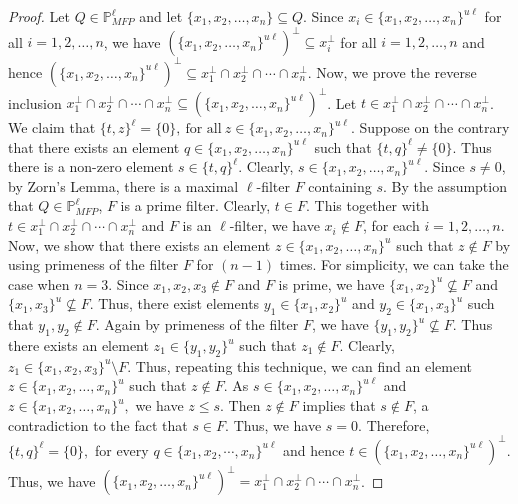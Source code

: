 \documentclass[10pt,one side,emlines]{amsart}
\theoremstyle{definition}
\begin{document}
\begin{proof} Let $Q\in \mathbb{P}^{\ell}_{MFP}$ and let $\{x_1,x_2,\ldots, x_n\} \subseteq Q$. Since $x_i\in \{x_1,x_2,\ldots, x_n\}^{u\ell}$ for all $i=1,2,\ldots, n$, we have $(\{x_1,x_2,\ldots, x_n\}^{u\ell})^{\perp } \subseteq x_i^{\perp }$ for all $i=1,2,\ldots, n$ and hence $(\{x_1,x_2,\ldots, x_n\}^{u\ell})^{\perp } \subseteq x_1^{\perp }\cap x_2^{\perp }\cap \cdots \cap x_n^{\perp }$. Now, we prove the reverse inclusion $ x_1^{\perp }\cap x_2^{\perp }\cap \cdots \cap x_n^{\perp } \subseteq (\{x_1,x_2,\ldots, x_n\}^{u\ell})^{\perp } $. Let $t\in x_1^{\perp }\cap x_2^{\perp }\cap \cdots \cap x_n^{\perp }$. We claim that $\{t,z\}^{\ell}=\{0\},~ \text{for all}~ z\in \{x_1,x_2,\ldots, x_n\}^{u\ell}$. Suppose on the contrary that there exists an element $q\in \{x_1,x_2,\ldots, x_n\}^{u\ell}$ such that $\{t,q\}^{\ell}\neq \{0\}$. Thus there is a non-zero element $s\in \{t,q\}^{\ell}$. Clearly, $s\in \{x_1,x_2,\ldots, x_n\}^{u\ell}$. Since $s\neq 0$, by Zorn’s Lemma, there is a maximal $\ell$-filter $F$ containing $s$. By the assumption that $Q\in \mathbb{P}^{\ell}_{MFP}$, $F$ is a prime filter. Clearly, $t\in F$. This together with $t\in x_1^{\perp }\cap x_2^{\perp }\cap \cdots \cap x_n^{\perp }$ and $F$ is an $\ell$-filter, we have $x_i\not \in F$, for each $i=1,2,\ldots , n$. Now, we show that there exists an element $z\in \{x_1,x_2,\ldots ,x_n\}^{u}$ such that $z\not \in F$ by using primeness of the filter $F$ for $(n-1)$ times. For simplicity, we can take the case when $n=3$. Since $x_1,x_2,x_3 \not \in F$ and $F$ is prime, we have $\{x_1,x_2\}^{u}\not \subseteq F$ and $\{x_1,x_3\}^{u}\not \subseteq F$. Thus, there exist elements $y_1\in \{x_1,x_2\}^{u}$ and $y_2\in \{x_1,x_3\}^{u}$ such that $y_1, y_2 \not \in F$. Again by primeness of the filter $F$, we have $\{y_1,y_2\}^{u}\not \subseteq F$. Thus there exists an element $z_1\in \{y_1,y_2\}^{u}$ such that $z_1\not \in F$. Clearly, $z_1\in \{x_1,x_2,x_3\}^{u} \setminus F $.   Thus, repeating this technique,  we can find an element $z\in \{x_1,x_2,\ldots,x_n\}^{u}$ such that $z\not \in F$.  As  $s\in \{x_1,x_2,\ldots , x_n\}^{u\ell}$ and $z\in \{x_1,x_2,\ldots ,x_n\}^{u},$ we have  $z\leq s.$ Then $z\not \in F$ implies that $s\not \in F$, a contradiction to the fact that $s\in F$. Thus, we have $s=0.$ Therefore, $\{t,q\}^{\ell}=\{0\},$ for every $q\in \{x_1,x_2,\cdots, x_n\}^{u\ell}$ and hence $t\in (\{x_1,x_2,\ldots , x_n\}^{u\ell})^{\perp }$. Thus, we have $(\{x_1,x_2,\ldots , x_n\}^{u\ell})^{\perp }=x_1^{\perp }\cap x_2^{\perp }\cap \cdots \cap x_n^{\perp }$.
\end{proof}
\end{document}
